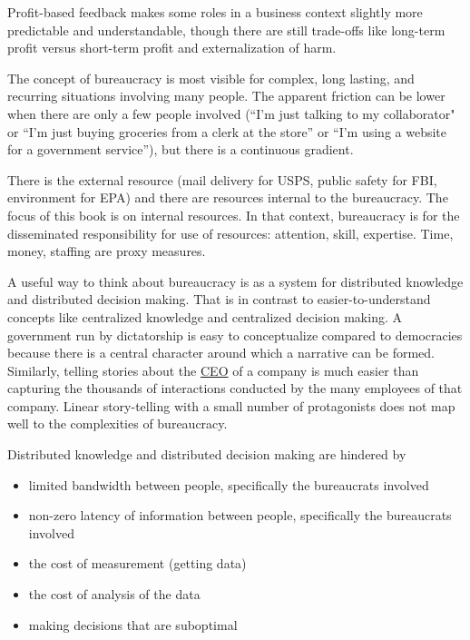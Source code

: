 Profit-based feedback makes some roles in a business context slightly more predictable and understandable, though there are still trade-offs like long-term profit versus short-term profit and externalization of harm. 

The concept of bureaucracy is most visible for complex, long lasting, and recurring situations involving many people. The apparent friction can be lower when there are only a few people involved (``I'm just talking to my collaborator" or ``I'm just buying groceries from a clerk at the store'' or ``I'm using a website for a government service''), but there is a continuous gradient. 

There is the external resource (mail delivery for USPS, public safety for FBI, environment for EPA) and there are resources internal to the bureaucracy. The focus of this book is on internal resources. In that context, bureaucracy is for the disseminated responsibility for use of resources: attention, skill, expertise. Time, money, staffing are proxy measures.



A useful way to think about bureaucracy is as a system for distributed knowledge and distributed decision making. That is in contrast to easier-to-understand concepts like centralized knowledge and centralized decision making. A government run by dictatorship is easy to conceptualize compared to democracies because there is a central character around which a narrative can be formed. Similarly, telling stories about the \href{https://en.wikipedia.org/wiki/Chief_executive_officer}{CEO} of a company is much easier than capturing the thousands of interactions conducted by the many employees of that company. Linear story-telling with a small number of protagonists does not map well to the complexities of bureaucracy. 


Distributed knowledge and distributed decision making are hindered by
\begin{itemize}
    \item limited bandwidth between people, specifically the bureaucrats involved
    \item non-zero latency of information between people, specifically the bureaucrats involved
    \item the cost of measurement (getting data)
    \item the cost of analysis of the data
    \item making decisions that are suboptimal
\end{itemize}

